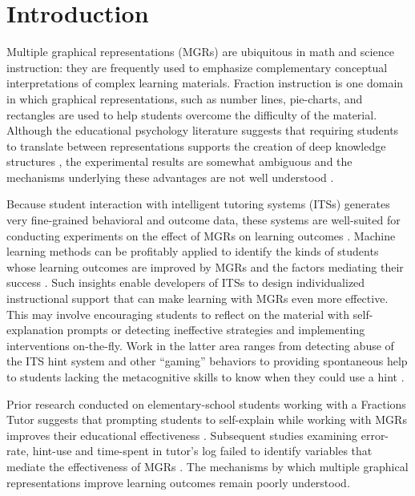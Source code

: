 \documentclass{edm_template}
\begin{document}

\section{Introduction}
\label{sec:introduction}

Multiple graphical representations (MGRs) are ubiquitous in math and science instruction: they are frequently used to emphasize complementary conceptual interpretations of complex learning materials. Fraction instruction is one domain in which graphical representations, such as number lines, pie-charts, and rectangles are used to help students overcome the difficulty of the material. Although the educational psychology literature suggests that requiring students to translate between representations supports the creation of deep knowledge structures \cite{Ambrose2010},  the experimental results are somewhat ambiguous \cite{Ainsworth1999} and the mechanisms underlying these advantages are not well understood \cite{Ainsworth2006}. 

Because student interaction with intelligent tutoring systems (ITSs) generates very fine-grained behavioral and outcome data, these systems are well-suited for conducting experiments on the effect of MGRs on learning outcomes \cite{Newell1981}. Machine learning methods can be profitably applied to identify the kinds of students whose learning outcomes are improved by MGRs and the factors mediating their success \cite{Self1986}. Such insights enable developers of ITSs to design individualized instructional support that can make learning with MGRs even more effective. This may involve encouraging students to reflect on the material with self-explanation prompts \cite{Rau2009} or detecting ineffective strategies and implementing interventions on-the-fly. Work in the latter area ranges from detecting abuse of the ITS hint system and other ``gaming'' behaviors \cite{Baker2009,Baker2009b} to providing spontaneous help to students lacking the metacognitive skills to know when they could use a hint \cite{Aleven2000,Aleven2006,Aleven2003}.

Prior research conducted on elementary-school students working with a Fractions Tutor suggests that prompting students to self-explain while working with MGRs improves their educational effectiveness \cite{Rau2009}. Subsequent studies examining error-rate, hint-use and time-spent in tutor's log failed to identify variables that mediate the effectiveness of MGRs \cite{Rau2012}. The mechanisms by which multiple graphical representations improve learning outcomes remain poorly understood.
\end{document}
